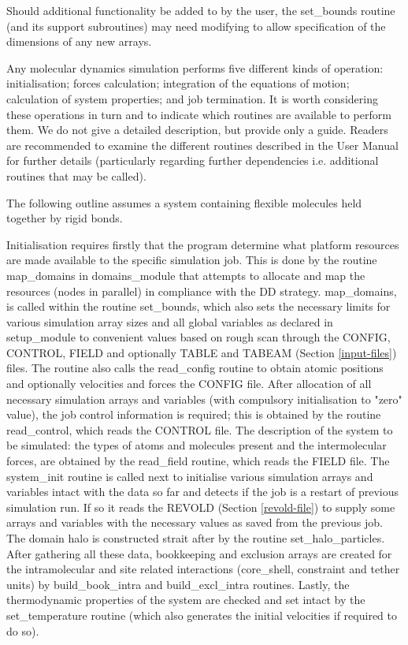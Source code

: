 Should additional functionality be added to \D by the user, the
{\sc set\_bounds} routine (and its support subroutines) may need
modifying to allow specification of the dimensions of any new
arrays.

Any molecular dynamics simulation performs five different kinds of
operation: initialisation; forces calculation; integration of the
equations of motion; calculation of system properties; and job
termination.  It is worth considering these operations in turn and
to indicate which \D routines are available to perform them.  We do
not give a detailed description, but provide only a guide.  Readers
are recommended to examine the different routines described in the
\D User Manual for further details (particularly regarding further
dependencies i.e. additional routines that may be called).

The following outline assumes a system containing flexible molecules
held together by rigid bonds.

Initialisation requires firstly that the program determine what
platform resources are made available to the specific simulation
job.  This is done by the \D routine {\sc map\_domains} in
{\sc domains\_module} that attempts to allocate and map the
resources (nodes in parallel) in compliance with the DD
strategy.  {\sc map\_domains}, is called
within the routine {\sc set\_bounds}, which also sets the necessary
limits for various simulation array sizes and all global
variables as declared in {\sc setup\_module} to convenient values
based on rough scan through the CONFIG, CONTROL, FIELD and optionally
TABLE and TABEAM (Section \ref{input-files}) files.  The routine also
calls the {\sc read\_config} routine to obtain atomic positions and
optionally velocities and forces the CONFIG file.  After allocation
of all necessary simulation arrays and variables (with compulsory
initialisation to "zero" value), the job control information is
required; this is obtained by the routine {\sc read\_control}, which
reads the CONTROL file.  The description of the system to be
simulated: the types of atoms and molecules present and the
intermolecular forces, are obtained by the {\sc read\_field} routine,
which reads the FIELD file.  The {\sc system\_init} routine is
called next to initialise various simulation arrays and variables
intact with the data so far and detects if the job is a restart of
previous simulation run.  If so it reads the REVOLD (Section
\ref{revold-file}) to supply some arrays and variables with the
necessary values as saved from the previous job.  The domain halo is
constructed strait after by the routine {\sc set\_halo\_particles}.
After gathering all these data, bookkeeping and exclusion arrays are
created for the intramolecular and site related interactions
(core\_shell, constraint and tether units) by {\sc build\_book\_intra}
and {\sc build\_excl\_intra} routines.  Lastly, the thermodynamic
properties of the system are checked and set intact by the
{\sc set\_temperature} routine (which also generates the initial
velocities if required to do so).

